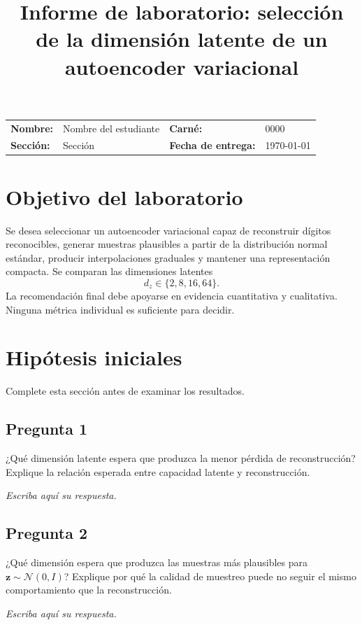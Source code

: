 \documentclass[11pt,letterpaper]{article}
\title{\textbf{Informe de laboratorio: selección de la dimensión latente de un autoencoder variacional}}
\author{}
\date{}
\newcommand{\studentname}{Nombre del estudiante}
\newcommand{\studentid}{0000}
\newcommand{\coursesection}{Sección}
\newcommand{\submissiondate}{\today}
\newcommand{\answerarea}[1][2.1cm]{%
\begin{responsebox}
\textit{Escriba aquí su respuesta.}
\vspace{#1}
\end{responsebox}
}
\begin{document}
\maketitle

\begin{center}
\renewcommand{\arraystretch}{1.35}
\begin{tabularx}{0.92\textwidth}{@{}>{\bfseries}lX>{\bfseries}lX@{}}
Nombre: & \studentname & Carné: & \studentid \\
Sección: & \coursesection & Fecha de entrega: & \submissiondate \\
\end{tabularx}
\end{center}

\section{Objetivo del laboratorio}

Se desea seleccionar un autoencoder variacional capaz de reconstruir dígitos
reconocibles, generar muestras plausibles a partir de la distribución normal
estándar, producir interpolaciones graduales y mantener una representación
compacta. Se comparan las dimensiones latentes
\[
d_z\in\{2,8,16,64\}.
\]
La recomendación final debe apoyarse en evidencia cuantitativa y cualitativa.
Ninguna métrica individual es suficiente para decidir.

\section{Hipótesis iniciales}

Complete esta sección antes de examinar los resultados.

\subsection*{Pregunta 1}
¿Qué dimensión latente espera que produzca la menor pérdida de reconstrucción?
Explique la relación esperada entre capacidad latente y reconstrucción.
\answerarea[2.5cm]

\subsection*{Pregunta 2}
¿Qué dimensión espera que produzca las muestras más plausibles para
$\mathbf z\sim\mathcal N(0,I)$? Explique por qué la calidad de muestreo puede no
seguir el mismo comportamiento que la reconstrucción.
\answerarea[2.5cm]
\end{document}
